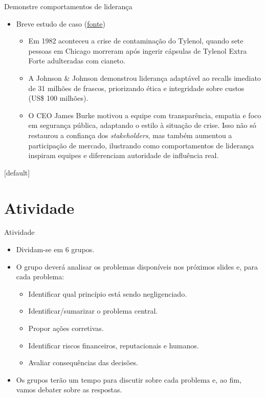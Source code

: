 \documentclass{beamer}
\begin{document}
\begin{frame}{Demonstre comportamentos de liderança}
	\begin{itemize}
		\justifying
		\item Breve estudo de caso (\href{https://en.wikipedia.org/wiki/Chicago_Tylenol_murders}{fonte})
		\begin{itemize}
			\justifying
			\item<1-> Em 1982 aconteceu a crise de contaminação do Tylenol, quando sete pessoas em Chicago morreram após ingerir cápsulas de Tylenol Extra Forte adulteradas com cianeto.
			\item<2-> A Johnson \& Johnson demonstrou liderança adaptável ao recalls imediato de 31 milhões de frascos, priorizando ética e integridade sobre custos (US\$ 100 milhões).
			\item<3-> O CEO James Burke motivou a equipe com transparência, empatia e foco em segurança pública, adaptando o estilo à situação de crise. Isso não só restaurou a confiança dos \textit{stakeholders}, mas também aumentou a participação de mercado, ilustrando como comportamentos de liderança inspiram equipes e diferenciam autoridade de influência real.
		\end{itemize}
	\end{itemize}
\end{frame}

[default]

\section{Atividade}

\begin{frame}{Atividade}
	\begin{itemize}
		\justifying
		\item Dividam-se em 6 grupos.
		\item O grupo deverá analisar os problemas disponíveis nos próximos slides e, para cada problema:
			\begin{itemize}
				\justifying
				\item Identificar qual princípio está sendo negligenciado.
				\item Identificar/sumarizar o problema central.
				\item Propor ações corretivas.
				\item Identificar riscos financeiros, reputacionais e humanos.
				\item Avaliar consequências das decisões.
			\end{itemize}
		\item Os grupos terão um tempo para discutir sobre cada problema e, ao fim, vamos debater sobre as respostas.
	\end{itemize}
\end{frame}
\end{document}
